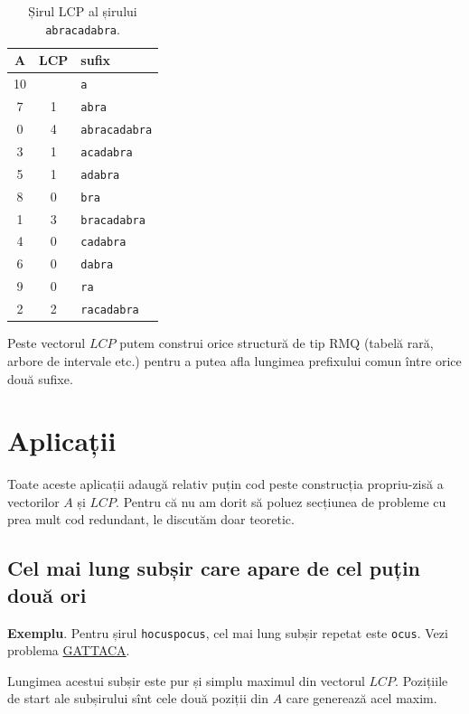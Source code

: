 \documentclass[../main.tex]{subfiles}
\begin{document}
\begin{table}[H]
  \centering
  \begin{tabular}{ccl}
    \textbf{A} & \textbf{LCP} & \textbf{sufix} \\
    \hline
    10 &   & \texttt{a} \\
     7 & 1 & \texttt{abra} \\
     0 & 4 & \texttt{abracadabra} \\
     3 & 1 & \texttt{acadabra} \\
     5 & 1 & \texttt{adabra} \\
     8 & 0 & \texttt{bra} \\
     1 & 3 & \texttt{bracadabra} \\
     4 & 0 & \texttt{cadabra} \\
     6 & 0 & \texttt{dabra} \\
     9 & 0 & \texttt{ra} \\
     2 & 2 & \texttt{racadabra} \\
    \hline
  \end{tabular}
  \caption{Șirul LCP al șirului \texttt{abracadabra}.}
\end{table}

Peste vectorul $LCP$ putem construi orice structură de tip RMQ (tabelă rară, arbore de intervale etc.) pentru a putea afla lungimea prefixului comun între orice două sufixe.

\section{Aplicații}

Toate aceste aplicații adaugă relativ puțin cod peste construcția propriu-zisă a vectorilor $A$ și $LCP$. Pentru că nu am dorit să poluez secțiunea de probleme cu prea mult cod redundant, le discutăm doar teoretic.

\subsection{Cel mai lung subșir care apare de cel puțin două ori}

\textbf{Exemplu}. Pentru șirul \texttt{hocuspocus}, cel mai lung subșir repetat este \texttt{ocus}. Vezi problema \href{https://onlinejudge.org/index.php?option=com_onlinejudge\&Itemid=8\&page=show_problem\&problem=2507}{GATTACA}.

Lungimea acestui subșir este pur și simplu maximul din vectorul $LCP$. Pozițiile de start ale subșirului sînt cele două poziții din $A$ care generează acel maxim.
\end{document}
